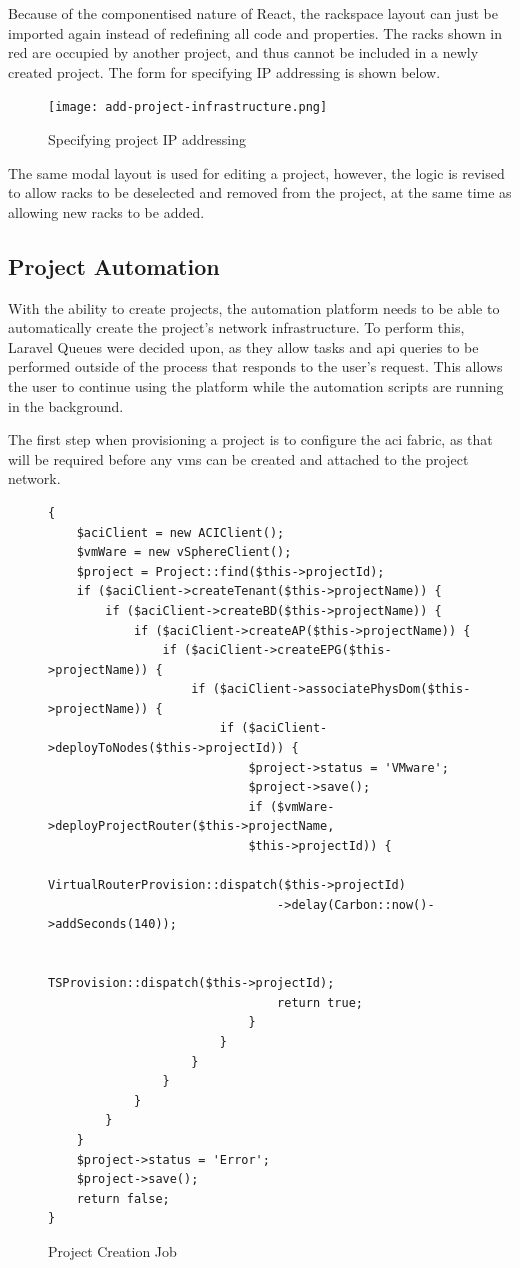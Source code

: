 Because of the componentised nature of React, the rackspace layout can just be imported again instead of redefining all code and properties. The racks shown in red are occupied by another project, and thus cannot be included in a newly created project. The form for specifying IP addressing is shown below.

\begin{figure}[H]
    \centering
    \texttt{[image: add-project-infrastructure.png]}
    \caption{Specifying project IP addressing}
    \label{fig:add-project-infrastructure}
\end{figure}

The same modal layout is used for editing a project, however, the logic is revised to allow racks to be deselected and removed from the project, at the same time as allowing new racks to be added.

\subsection{Project Automation}
With the ability to create projects, the automation platform needs to be able to automatically create the project's network infrastructure. To perform this, Laravel Queues were decided upon, as they allow tasks and \gls{api} queries to be performed outside of the process that responds to the user's request. This allows the user to continue using the platform while the automation scripts are running in the background.

The first step when provisioning a project is to configure the \gls{aci} fabric, as that will be required before any \gls{vm}s can be created and attached to the project network.

\begin{figure}[H]
    \begin{lstlisting}[basicstyle=\scriptsize]
{
    $aciClient = new ACIClient();
    $vmWare = new vSphereClient();
    $project = Project::find($this->projectId);
    if ($aciClient->createTenant($this->projectName)) {
        if ($aciClient->createBD($this->projectName)) {
            if ($aciClient->createAP($this->projectName)) {
                if ($aciClient->createEPG($this->projectName)) {
                    if ($aciClient->associatePhysDom($this->projectName)) {
                        if ($aciClient->deployToNodes($this->projectId)) {
                            $project->status = 'VMware';
                            $project->save();
                            if ($vmWare->deployProjectRouter($this->projectName,
                            $this->projectId)) {
                                VirtualRouterProvision::dispatch($this->projectId)
                                ->delay(Carbon::now()->addSeconds(140));

                                TSProvision::dispatch($this->projectId);
                                return true;
                            }
                        }
                    }
                }
            }
        }
    }
    $project->status = 'Error';
    $project->save();
    return false;
}
\end{lstlisting}
    \caption{Project Creation Job}
    \label{fig:project-creation-job}
\end{figure}

